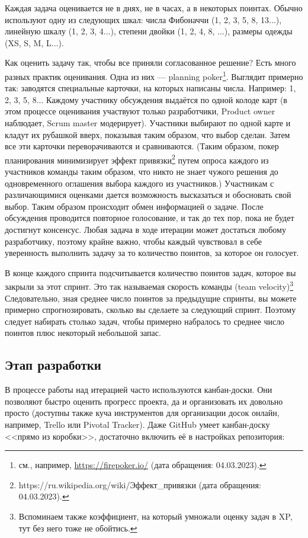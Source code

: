\documentclass{../../text-style}
\begin{document}
Каждая задача оценивается не в днях, не в часах, а в некоторых поинтах. Обычно используют одну из следующих шкал: числа Фибоначчи (1, 2, 3, 5, 8, 13...), линейную шкалу (1, 2, 3, 4...), степени двойки (1, 2, 4, 8, ...), размеры одежды (XS, S, M, L...).

Как оценить задачу так, чтобы все приняли согласованное решение? Есть много разных практик оценивания. Одна из них --- planning poker\footnote{см., например, \url{https://firepoker.io/} (дата обращения: 04.03.2023).}. Выглядит примерно так: заводятся специальные карточки, на которых написаны числа. Например: 1, 2, 3, 5, 8... Каждому участнику обсуждения выдаётся по одной колоде карт (в этом процессе оценивания участвуют только разработчики, Product owner наблюдает, Scrum master модерирует). Участники выбирают по одной карте и кладут их рубашкой вверх, показывая таким образом, что выбор сделан. Затем все эти карточки переворачиваются и сравниваются. (Таким образом, покер планирования минимизирует эффект привязки\footnote{https://ru.wikipedia.org/wiki/Эффект\_привязки (дата обращения: 04.03.2023).} путем опроса каждого из участников команды таким образом, что никто не знает чужого решения до одновременного оглашения выбора каждого из участников.) Участникам с различающимися оценками дается возможность высказаться и обосновать свой выбор. Таким образом происходит обмен информацией о задаче. После обсуждения проводится повторное голосование, и так до тех пор, пока не будет достигнут консенсус. Любая задача в ходе итерации может достаться любому разработчику, поэтому крайне важно, чтобы каждый чувствовал в себе уверенность выполнить задачу за то количество поинтов, за которое он голосует.

В конце каждого спринта подсчитывается количество поинтов задач, которое вы закрыли за этот спринт. Это так называемая скорость команды (team velocity)\footnote{Вспоминаем также коэффициент, на который умножали оценку задач в XP, тут без него тоже не обойтись.} Следовательно, зная среднее число поинтов за предыдущие спринты, вы можете примерно спрогнозировать, сколько вы сделаете за следующий спринт. Поэтому следует набирать столько задач, чтобы примерно набралось то среднее число поинтов плюс некоторый небольшой запас.

\subsection{Этап разработки}

В процессе работы над итерацией часто используются канбан-доски. Они  позволяют быстро оценить прогресс проекта, да и организовать их довольно просто (доступны также куча инструментов для организации досок онлайн, например, Trello или Pivotal Tracker). Даже GitHub умеет канбан-доску <<прямо из коробки>>, достаточно включить её в настройках репозитория:
\end{document}
